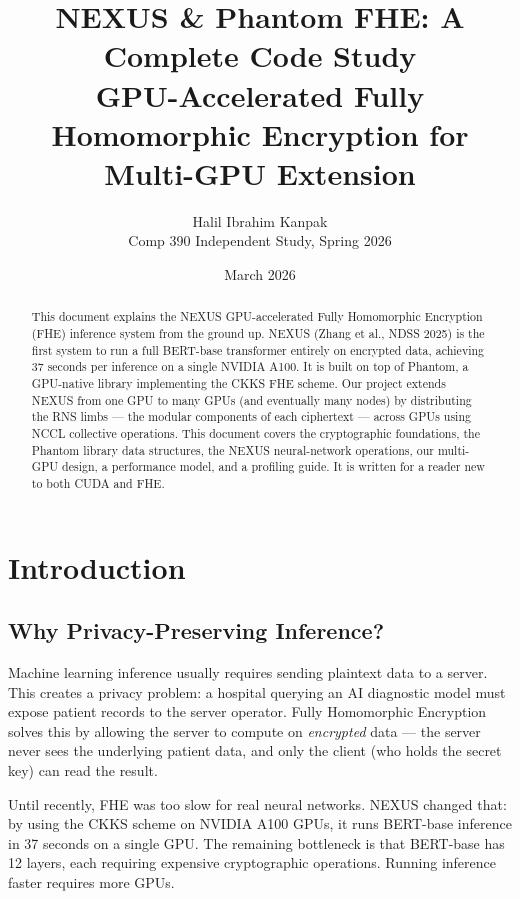 \documentclass[11pt,letterpaper]{article}
\title{\textbf{NEXUS \& Phantom FHE: A Complete Code Study}\\
\large GPU-Accelerated Fully Homomorphic Encryption for Multi-GPU Extension}
\author{Halil Ibrahim Kanpak \\ Comp 390 Independent Study, Spring 2026}
\date{March 2026}
\begin{document}
\maketitle

\begin{abstract}
This document explains the NEXUS GPU-accelerated Fully Homomorphic Encryption (FHE) inference
system from the ground up. NEXUS (Zhang et al., NDSS 2025) is the first system to run a full
BERT-base transformer entirely on encrypted data, achieving 37 seconds per inference on a
single NVIDIA A100. It is built on top of Phantom, a GPU-native library implementing the CKKS
FHE scheme. Our project extends NEXUS from one GPU to many GPUs (and eventually many nodes) by
distributing the RNS limbs --- the modular components of each ciphertext --- across GPUs using
NCCL collective operations. This document covers the cryptographic foundations, the Phantom
library data structures, the NEXUS neural-network operations, our multi-GPU design, a
performance model, and a profiling guide. It is written for a reader new to both CUDA
and FHE.
\end{abstract}

\tableofcontents
\newpage

\section{Introduction}

\subsection{Why Privacy-Preserving Inference?}

Machine learning inference usually requires sending plaintext data to a server. This creates
a privacy problem: a hospital querying an AI diagnostic model must expose patient records to
the server operator. Fully Homomorphic Encryption solves this by allowing the server to
compute on \emph{encrypted} data --- the server never sees the underlying patient data, and
only the client (who holds the secret key) can read the result.

Until recently, FHE was too slow for real neural networks. NEXUS changed that: by using the
CKKS scheme on NVIDIA A100 GPUs, it runs BERT-base inference in 37 seconds on a single GPU.
The remaining bottleneck is that BERT-base has 12 layers, each requiring expensive
cryptographic operations. Running inference faster requires more GPUs.
\end{document}

